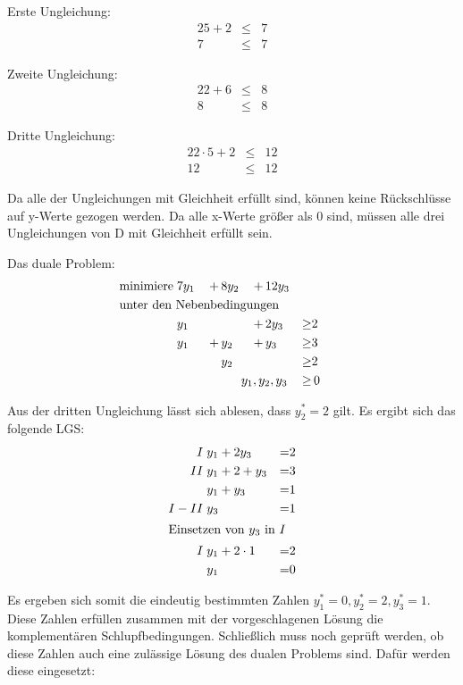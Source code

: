 \documentclass[10pt,a4paper,oneside,ngerman,numbers=noenddot]{scrartcl}
\begin{document}
		Erste Ungleichung:
		\begin{alignat*}{2}
			5 + 2 &\leq & 7 \\
			7 &\leq & 7
		\end{alignat*}
		
		Zweite Ungleichung:
		\begin{alignat*}{2}
			2 + 6 &\leq & 8 \\
			8 &\leq & 8
		\end{alignat*}
		
		Dritte Ungleichung:
		\begin{alignat*}{2}
			2 \cdot 5 + 2 &\leq & 12 \\
			12 &\leq & 12
		\end{alignat*}
		
		Da alle der Ungleichungen mit Gleichheit erfüllt sind, können keine Rückschlüsse auf y-Werte gezogen werden. Da alle x-Werte größer als 0 sind, müssen alle drei Ungleichungen von D mit Gleichheit erfüllt sein.
		
		Das duale Problem:
		\begin{alignat*}{4}
			\text{minimiere}\; & 7y_{1} \,&+&\, 8y_{2} \,&+&\, 12y_{3} && \\
			\multicolumn{8}{l}{\text{unter den Nebenbedingungen}} && \\
			\;& y_{1} \,&& &+&\, 2y_{3} \,&\geq & 2 \\
			\;& y_{1} \,&+&\, y_{2} \,&+&\, y_{3} \,&\geq & 3 \\
			\;& &&\, y_{2} && &\geq & 2 \\
			\multicolumn{6}{r}{$y_{1}, y_{2}, y_{3}$} \,&\geq &\, 0
		\end{alignat*}
		
		Aus der dritten Ungleichung lässt sich ablesen, dass $y_{2}^{*} = 2$ gilt. Es ergibt sich das folgende LGS:
		\begin{alignat*}{2}
			I \;& y_{1} + 2y_{3} &=& 2 \\
			II \;& y_{1} + 2 + y_{3} &=& 3 \\
			\;& y_{1} + y_{3} &=& 1 \\
			I - II \;& y_{3} &=& 1 \\
			\intertext{Einsetzen von $y_{3}$ in $I$}
			I \;& y_{1} + 2 \cdot 1 &=& 2 \\
			\;& y_{1} &=& 0
		\end{alignat*}
		
		Es ergeben sich somit die eindeutig bestimmten Zahlen $y_{1}^{*} = 0, y_{2}^{*} = 2, y_{3}^{*} = 1$. Diese Zahlen erfüllen zusammen mit der vorgeschlagenen Lösung die komplementären Schlupfbedingungen.
		Schließlich muss noch geprüft werden, ob diese Zahlen auch eine zulässige Lösung des dualen Problems sind. Dafür werden diese eingesetzt:
\end{document}
